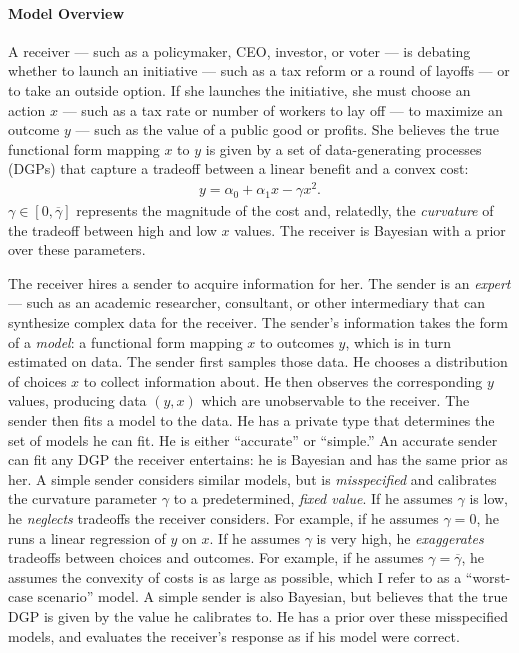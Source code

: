 \documentclass[11pt,dvipsnames]{article}
\begin{document}
\paragraph{Model Overview}
A receiver --- such as a policymaker, CEO, investor, or voter --- is debating whether to launch an initiative --- such as a tax reform or a round of layoffs --- or to take an outside option.
If she launches the initiative, she must choose an action $x$ --- such as a tax rate or number of workers to lay off --- to maximize an outcome $y$ --- such as the value of a public good or profits.
She believes the true functional form mapping $x$ to $y$ is given by a set of data-generating processes (DGPs) that capture a tradeoff between a linear benefit and a convex cost:
\begin{align*}
y = \alpha_0+\alpha_1x - \gamma x^2.	
\end{align*}
$\gamma \in [0,\overline{\gamma}]$ represents the magnitude of the cost and, relatedly, the \emph{curvature} of the tradeoff between high and low $x$ values.
The receiver is Bayesian with a prior over these parameters.

The receiver hires a sender to acquire information for her.
The sender is an \emph{expert} --- such as an academic researcher, consultant, or other intermediary that can synthesize complex data for the receiver.
The sender's information takes the form of a \emph{model}: a functional form mapping $x$ to outcomes $y$, which is in turn estimated on data.
The sender first samples those data.
He chooses a distribution of choices $x$ to collect information about.
He then observes the corresponding $y$ values, producing data $(y,x)$ which are unobservable to the receiver.
The sender then fits a model to the data.
He has a private type that determines the set of models he can fit.
He is either ``accurate'' or ``simple.''
An accurate sender can fit any DGP the receiver entertains: he is Bayesian and has the same prior as her.
A simple sender considers similar models, but is \emph{misspecified} and calibrates the curvature parameter $\gamma$ to a predetermined, \emph{fixed value}.
If he assumes $\gamma$ is low, he \emph{neglects} tradeoffs the receiver considers.
For example, if he assumes $\gamma=0$, he runs a linear regression of $y$ on $x$.
If he assumes $\gamma$ is very high, he \emph{exaggerates} tradeoffs between choices and outcomes.
For example, if he assumes $\gamma=\overline{\gamma}$, he assumes the convexity of costs is as large as possible, which I refer to as a ``worst-case scenario'' model.
A simple sender is also Bayesian, but believes that the true DGP is given by the value he calibrates to. He has a prior over these misspecified models, and evaluates the receiver's response as if his model were correct.
\end{document}
